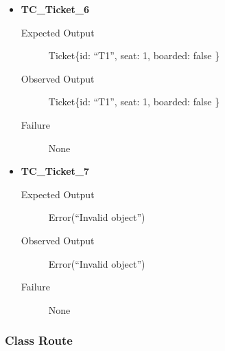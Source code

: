 \documentclass[11pt]{article}
\begin{document}
\begin{itemize}
\item \textbf{TC\_Ticket\_6}
\begin{description}
\item[{Expected Output}] Ticket\{id: “T1”, seat: 1, boarded: false \}
\item[{Observed Output}] Ticket\{id: “T1”, seat: 1, boarded: false \}
\item[{Failure}] None
\end{description}

\item \textbf{TC\_Ticket\_7}
\begin{description}
\item[{Expected Output}] Error(“Invalid object”)
\item[{Observed Output}] Error(“Invalid object”)
\item[{Failure}] None
\end{description}
\end{itemize}

\subsubsection{Class Route}
\label{sec:org363efa5}
\end{document}
